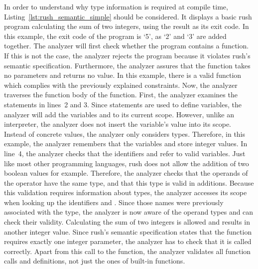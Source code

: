 
In order to understand why type information is required at compile time, Listing~\ref{lst:rush_semantic_simple} should be considered.
It displays a basic rush program calculating the sum of two integers, using the result as its exit code.
In this example, the exit code of the program is `5', as `2' and `3' are added together.
The analyzer will first check whether the program contains a  function.
If this is not the case, the analyzer rejects the program because it violates rush's semantic specification.
Furthermore, the analyzer assures that the  function takes no parameters and returns no value.
In this example, there is a valid  function which complies with the previously explained constraints.
Now, the analyzer traverses the function body of the  function. First, the analyzer examines the statements in lines~2 and 3.
Since  statements are used to define variables, the analyzer will add the variables  and  to its
current scope. However, unlike an interpreter, the analyzer does not insert the
variable's value into its scope. Instead of concrete values, the analyzer
only considers types. Therefore, in this example, the
analyzer remembers that the variables  and  store integer values.
In line~4, the analyzer checks that the identifiers  and  refer to valid variables.
Just like most other programming languages, rush does not allow the addition
of two boolean values for example. Therefore, the analyzer checks that the operands
of the \qVerb{+} operator have the same type, and that this type is valid in additions.
Because this validation requires information about types, the analyzer accesses
its scope when looking up the identifiers  and . Since those names
were previously associated with the  type, the analyzer is now aware of the
operand types and can check their validity.
Calculating the sum of two integers is allowed and results in another integer value.
Since rush's semantic specification states that the  function requires exactly one integer parameter, the analyzer has to check that it is called correctly.
Apart from this call to the  function, the analyzer validates all function calls and definitions, not just the ones of built-in functions.

